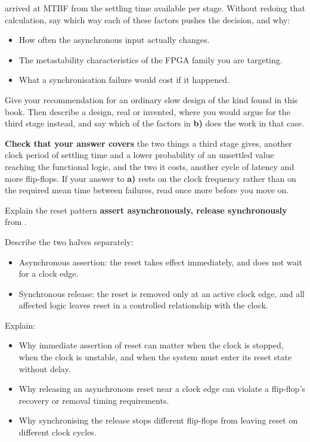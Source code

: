   arrived at MTBF from the settling time available per stage. Without
redoing that calculation, say which way each of these factors pushes the decision, and why:
\begin{itemize}
  \item How often the asynchronous input actually changes.
  \item The metastability characteristics of the FPGA family you are targeting.
  \item What a synchronisation failure would cost if it happened.
\end{itemize}

 Give your recommendation for an ordinary slow design of the kind found in this book. Then
describe a design, real or invented, where you would argue for the third stage instead, and say
which of the factors in \textbf{b)} does the work in that case.

\begin{aside}
\textbf{Check that your answer covers} the two things a third stage gives, another clock period of
settling time and a lower probability of an unsettled value reaching the functional logic, and the
two it costs, another cycle of latency and more flip-flops. If your answer to \textbf{a)} rests on
the clock frequency rather than on the required mean time between failures, read 
once more before you move on.
\end{aside}

\label{c4:ex:resetpattern}
Explain the reset pattern \textbf{assert asynchronously, release synchronously} from
.

Describe the two halves separately:
\begin{itemize}
  \item Asynchronous assertion: the reset takes effect immediately, and does not wait for a clock
    edge.
  \item Synchronous release: the reset is removed only at an active clock edge, and all affected
    logic leaves reset in a controlled relationship with the clock.
\end{itemize}

Explain:
\begin{itemize}
  \item Why immediate assertion of reset can matter when the clock is stopped, when the clock is
    unstable, and when the system must enter its reset state without delay.
  \item Why releasing an asynchronous reset near a clock edge can violate a flip-flop's recovery or
    removal timing requirements.
  \item Why synchronising the release stops different flip-flops from leaving reset on different
    clock cycles.
\end{itemize}

